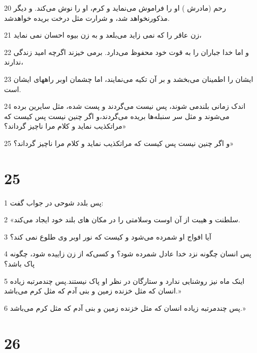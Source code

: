 \par 20 رحم (مادرش ) او را فراموش می‌نماید و کرم، او را نوش می‌کند. و دیگر مذکورنخواهد شد، و شرارت مثل درخت بریده خواهدشد. 
\par 21 زن عاقر را که نمی زاید می‌بلعد و به زن بیوه احسان نمی نماید،
\par 22 و اما خدا جباران را به قوت خود محفوظ می‌دارد. برمی خیزند اگرچه امید زندگی ندارند،
\par 23 ایشان را اطمینان می‌بخشد و بر آن تکیه می‌نمایند، اما چشمان اوبر راههای ایشان است.
\par 24 اندک زمانی بلندمی شوند، پس نیست می‌گردند و پست شده، مثل سایرین برده می‌شوند و مثل سر سنبله‌ها بریده می‌گردند،و اگر چنین نیست پس کیست که مراتکذیب نماید و کلام مرا ناچیز گرداند؟»
\par 25 و اگر چنین نیست پس کیست که مراتکذیب نماید و کلام مرا ناچیز گرداند؟»
 
\chapter{25}

\par 1 پس بلدد شوحی در جواب گفت:
\par 2 «سلطنت و هیبت از آن اوست وسلامتی را در مکان های بلند خود ایجاد می‌کند.
\par 3 آیا افواج او شمرده می‌شود و کیست که نور اوبر وی طلوع نمی کند؟
\par 4 پس انسان چگونه نزد خدا عادل شمرده شود؟ و کسی‌که از زن زاییده شود، چگونه پاک باشد؟
\par 5 اینک ماه نیز روشنایی ندارد و ستارگان در نظر او پاک نیستند.پس چندمرتبه زیاده انسان که مثل خزنده زمین و بنی آدم که مثل کرم می‌باشد.»
\par 6 پس چندمرتبه زیاده انسان که مثل خزنده زمین و بنی آدم که مثل کرم می‌باشد.»
 
\chapter{26}

